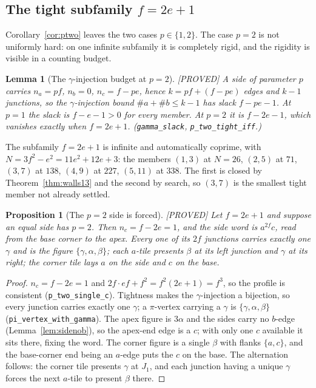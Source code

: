 \documentclass[11pt,reqno]{amsart}
\theoremstyle{plain}
\newtheorem{lemma}[theorem]{Lemma}
\newtheorem{proposition}[theorem]{Proposition}
\theoremstyle{definition}
\newcommand{\lab}[1]{\hfill\textnormal{\footnotesize\textsc{[#1]}}}
\begin{document}
\subsection{The tight subfamily \texorpdfstring{$f=2e+1$}{f=2e+1}}\label{sub:tight}

Corollary~\ref{cor:ptwo} leaves the two cases $p\in\{1,2\}$. The case $p=2$ is not uniformly hard:
on one infinite subfamily it is completely rigid, and the rigidity is visible in a counting budget.

\begin{lemma}[The $\gamma$-injection budget at $p=2$]\label{lem:tight}\lab{PROVED}
A side of parameter $p$ carries $n_a=pf$, $n_b=0$, $n_c=f-pe$, hence $k=pf+(f-pe)$ edges and $k-1$
junctions, so the $\gamma$-injection bound $\#a+\#b\le k-1$ has slack $f-pe-1$. At $p=1$ the slack is
$f-e-1>0$ for every member. At $p=2$ it is $f-2e-1$, which vanishes exactly when $f=2e+1$.
\textup{(}\texttt{gamma\_slack}, \texttt{p\_two\_tight\_iff}.\textup{)}
\end{lemma}

The subfamily $f=2e+1$ is infinite and automatically coprime, with $N=3f^2-e^2=11e^2+12e+3$: the
members $(1,3)$ at $N=26$, $(2,5)$ at $71$, $(3,7)$ at $138$, $(4,9)$ at $227$, $(5,11)$ at $338$.
The first is closed by Theorem~\ref{thm:walls13} and the second by search, so $(3,7)$ is the smallest
tight member not already settled.

\begin{proposition}[The $p=2$ side is forced]\label{prop:tightside}\lab{PROVED}
Let $f=2e+1$ and suppose an equal side has $p=2$. Then $n_c=f-2e=1$, and the side word is
$a^{2f}c$, read from the base corner to the apex. Every one of its $2f$ junctions carries exactly one
$\gamma$ and is the figure $\{\gamma,\alpha,\beta\}$; each $a$-tile presents $\beta$ at its left
junction and $\gamma$ at its right; the corner tile lays $a$ on the side and $c$ on the base.
\end{proposition}

\begin{proof}
$n_c=f-2e=1$ and $2f\cdot ef+f^2=f^2(2e+1)=f^3$, so the profile is consistent
(\texttt{p\_two\_single\_c}). Tightness makes the $\gamma$-injection a bijection, so every junction
carries exactly one $\gamma$; a $\pi$-vertex carrying a $\gamma$ is $\{\gamma,\alpha,\beta\}$
(\texttt{pi\_vertex\_with\_gamma}). The apex figure is $3\alpha$ and the sides carry no $b$-edge
(Lemma~\ref{lem:sidenob}), so the apex-end edge is a $c$; with only one $c$ available it sits there,
fixing the word. The corner figure is a single $\beta$ with flanks $\{a,c\}$, and the base-corner end
being an $a$-edge puts the $c$ on the base. The alternation follows: the corner tile presents
$\gamma$ at $J_1$, and each junction having a unique $\gamma$ forces the next $a$-tile to present
$\beta$ there.
\end{proof}
\end{document}
